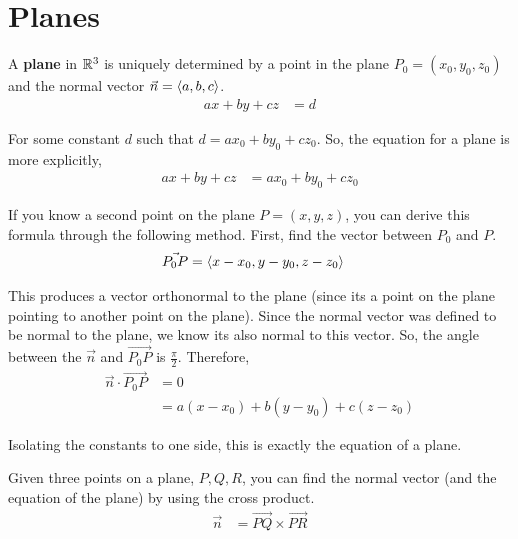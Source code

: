 \section{Planes}

\begin{definition}
    A \textbf{plane} in $\mathbb{R}^3$ is uniquely determined by a point in the plane $P_0 = (x_0, y_0, z_0)$ and the normal vector $\vec{n} = \langle a, b, c \rangle$.
    \begin{align*}
        ax + by + cz &= d
    \end{align*}

    For some constant $d$ such that $d = ax_0 + by_0 + cz_0$. So, the equation for a plane is more explicitly,
    \begin{align*}
        ax + by + cz &= ax_0 + by_0 + cz_0
    \end{align*}

    If you know a second point on the plane $P = (x, y ,z)$, you can derive this formula through the following method. First, find the vector
    between $P_0$ and $P$.
    \begin{align*}
        \vec{P_0 P} &= \langle x - x_0, y - y_0, z - z_0 \rangle
    \end{align*}

    This produces a vector orthonormal to the plane (since its a point on the plane pointing to another point on the plane). Since the normal vector
    was defined to be normal to the plane, we know its also normal to this vector. So, the angle between the $\vec{n}$ and $\vec{P_0 P}$ is 
    $\frac{\pi}{2}$. Therefore,
    \begin{align*}
        \vec{n} \cdot \vec{P_0 P} &= 0 \\
        &= a(x - x_0) + b(y - y_0) + c(z - z_0)
    \end{align*}

    Isolating the constants to one side, this is exactly the equation of a plane.
\end{definition}

\begin{remark}
    Given three points on a plane, $P, Q, R$, you can find the normal vector (and the equation of the plane) by using the cross product.
    \begin{align*}
        \vec{n} &= \vec{P Q} \times \vec{PR}
    \end{align*}
\end{remark}